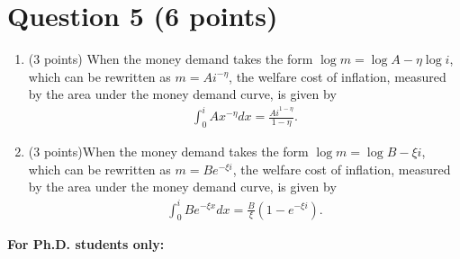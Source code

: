 \documentclass[12pt]{article}
\begin{document}
\section*{Question 5 (6 points)}
\begin{enumerate}[label=\arabic*.]
    \item (3 points) When the money demand takes the form $\log m = \log A - \eta \log i$, which can be rewritten as $m = A i^{-\eta}$, the welfare cost of inflation, measured by the area under the money demand curve, is given by
    \begin{align*}
        \int_0^i A x^{-\eta} dx = \frac{A i^{1-\eta}}{1-\eta}.
    \end{align*}
    \item (3 points)When the money demand takes the form $\log m = \log B - \xi i$, which can be rewritten as $m = B e^{-\xi i}$, the welfare cost of inflation, measured by the area under the money demand curve, is given by
    \begin{align*}
        \int_0^i B e^{-\xi x} dx = \frac{B}{\xi} (1 - e^{-\xi i}).
    \end{align*}
\end{enumerate}

\newpage

\textbf{For Ph.D. students only:}
\end{document}
